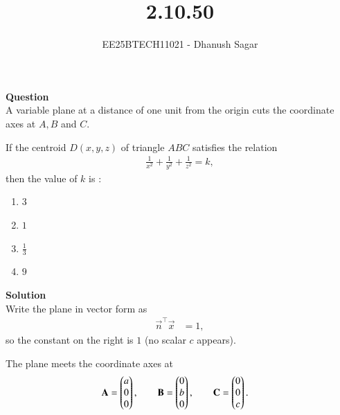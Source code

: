 \documentclass[journal]{IEEEtran}
\begin{document}



\title{2.10.50}
\author{EE25BTECH11021 - Dhanush Sagar
}
{\let\newpage\relax\maketitle}

\renewcommand{\thefigure}{\theenumi}
\renewcommand{\thetable}{\theenumi}
\setlength{\intextsep}{10pt} %


\renewcommand{\thetable}{\theenumi}


\textbf{Question} \\
A variable plane at a distance of one unit from the origin cuts the coordinate axes at $A, B$ and $C$.  


If the centroid $D(x,y,z)$ of triangle $ABC$ satisfies the relation  
\begin{align*}
\frac{1}{x^{2}} + \frac{1}{y^{2}} + \frac{1}{z^{2}} = k,
\end{align*}
then the value of $k$ is :  

\begin{multicols}{2}
\begin{enumerate}
   \item $3$
    \item $1$
    \item $\tfrac{1}{3}$
    \item $9$
\end{enumerate}
\end{multicols}

\textbf{Solution} \\
Write the plane in vector form as
\begin{align}
\vec{n}^\top \vec{x} &= 1,
\end{align}
so the constant on the right is \(1\) (no scalar \(c\) appears).

The plane meets the coordinate axes at
\begin{align}
\mathbf{A} &= \begin{pmatrix}a\\0\\0\end{pmatrix}, \qquad
\mathbf{B} = \begin{pmatrix}0\\b\\0\end{pmatrix}, \qquad
\mathbf{C} = \begin{pmatrix}0\\0\\c\end{pmatrix}.
\end{align}
\end{document}

